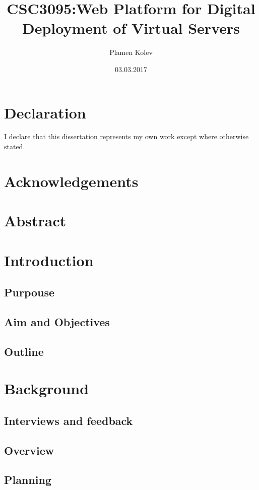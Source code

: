 \documentclass{article}
\title{CSC3095:Web Platform for Digital Deployment of Virtual Servers}
\date{03.03.2017}
\author{Plamen Kolev}
\begin{document}
  \maketitle
  \newpage

  \newpage
  \section{Declaration}
    I declare that this dissertation represents my own work except where otherwise stated.

  \section{Acknowledgements}


  \newpage
  \section{Abstract}

  \tableofcontents
  \newpage
  \listoffigures
  \newpage

  \newpage
  \section{Introduction}
  \subsection{Purpouse}
  \subsection{Aim and Objectives}
  \subsection{Outline}

  \newpage
  \section{Background}
  \subsection{Interviews and feedback}

  \subsection{Overview}
  \subsection{Planning}
\end{document}
